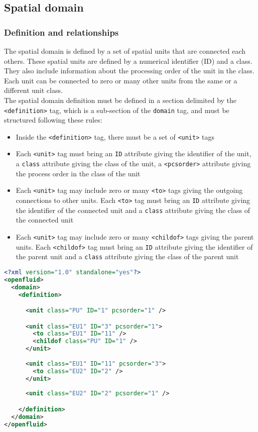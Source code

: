 \bigskip

\subsection{Spatial domain}

\subsubsection{Definition and relationships}

The spatial domain is defined by a set of spatial units that are connected each others.
These spatial units are defined by a numerical identifier (ID) and a class.
They also include information about the processing order of the unit in the class.
Each unit can be connected to zero or many other units from the same or a different unit class.\\
\noindent The spatial domain definition must be defined in a section delimited
by the \texttt{<definition>} tag, which is a sub-section of the \texttt{domain}
tag, and must be structured following these rules:
\begin{itemize}
  \item Inside the \texttt{<definition>} tag, there must be a set of
  \texttt{<unit>} tags
  \item Each \texttt{<unit>} tag must bring an \texttt{ID} attribute giving
  the identifier of the unit, a \texttt{class} attribute giving the class of
  the unit, a \texttt{<pcsorder>} attribute giving the process order in the
  class of the unit
  \item Each \texttt{<unit>} tag may include zero or many \texttt{<to>} tags giving
  the outgoing connections to other units. Each \texttt{<to>} tag must bring an
  \texttt{ID} attribute giving the identifier of the connected unit and a
  \texttt{class} attribute giving the class of the connected unit
  \item Each \texttt{<unit>} tag may include zero or many \texttt{<childof>}
  tags giving the parent units. Each \texttt{<childof>} tag must bring an
  \texttt{ID} attribute giving the identifier of the parent unit and a
  \texttt{class} attribute giving the class of the parent unit   
\end{itemize}

\begin{lstlisting}[language=xml,title=\footnotesize\textit{example}]
<?xml version="1.0" standalone="yes"?>
<openfluid>
  <domain>
    <definition>

      <unit class="PU" ID="1" pcsorder="1" />

      <unit class="EU1" ID="3" pcsorder="1">
        <to class="EU1" ID="11" />
        <childof class="PU" ID="1" />
      </unit>
      
      <unit class="EU1" ID="11" pcsorder="3">
        <to class="EU2" ID="2" />
      </unit>
      
      <unit class="EU2" ID="2" pcsorder="1" />

    </definition>
  </domain>
</openfluid>
\end{lstlisting}
\bigskip


